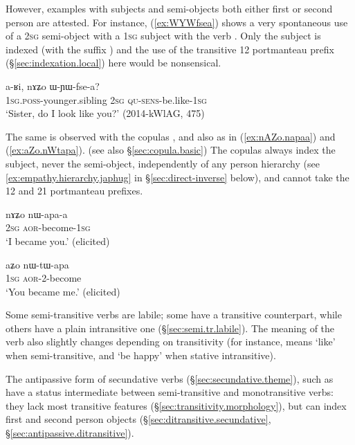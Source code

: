 However, examples with subjects and semi-objects both either first or second person are attested. For instance, (\ref{ex:WYWfsea}) shows a very spontaneous use of a \textsc{2sg} semi-object with a \textsc{1sg} subject with the verb . Only the subject is indexed (with the suffix ) and the use of the transitive  1\fl{}2 portmanteau prefix (§\ref{sec:indexation.local}) here would be nonsensical. 

\begin{exe}
\ex \label{ex:WYWfsea}
\gll a-ʁi, nɤʑo ɯ-ɲɯ-fse-a? \\
\textsc{1sg}.\textsc{poss}-younger.sibling \textsc{2sg} \textsc{qu}-\textsc{sens}-be.like-\textsc{1sg} \\
\glt `Sister, do I look like you?' (2014-kWlAG, 475)
\end{exe}

The same is observed with the copulas ,   and also  as in (\ref{ex:nAZo.napaa}) and (\ref{ex:aZo.nWtapa}). (see also §\ref{sec:copula.basic}) The copulas always index the subject, never the semi-object, independently of any person hierarchy (see \ref{ex:empathy.hierarchy.japhug} in §\ref{sec:direct-inverse} below), and cannot take the  1\fl{}2  and  2\fl{}1 portmanteau prefixes.
 
\begin{exe}
\ex \label{ex:nAZo.napaa}
\gll nɤʑo nɯ-apa-a \\
\textsc{2sg} \textsc{aor}-become-\textsc{1sg} \\
\glt `I became you.' (elicited)
\end{exe}

\begin{exe}
\ex \label{ex:aZo.nWtapa}
\gll aʑo nɯ-tɯ-apa \\
\textsc{1sg} \textsc{aor}-2-become \\
\glt `You became me.' (elicited)
\end{exe}

Some semi-transitive verbs are labile; some have a transitive counterpart, while others have a plain intransitive one (§\ref{sec:semi.tr.labile}). The meaning of the verb also slightly changes depending on transitivity (for instance,  means `like' when semi-transitive, and `be happy' when stative intransitive).
  
The antipassive form of secundative verbs (§\ref{sec:secundative.theme}), such as  have a status intermediate between semi-transitive and monotransitive verbs: they lack most transitive features (§\ref{sec:transitivity.morphology}), but can index first and second person objects (§\ref{sec:ditransitive.secundative}, §\ref{sec:antipassive.ditransitive}).

